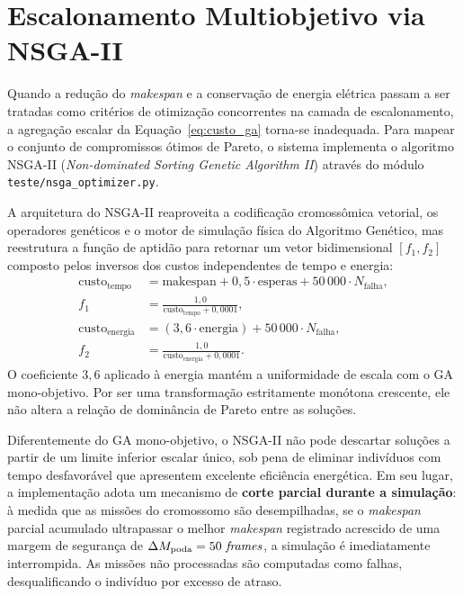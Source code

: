\section{Escalonamento Multiobjetivo via NSGA-II}\label{sec:dev_nsga}

Quando a redução do \textit{makespan} e a conservação de energia elétrica passam a ser tratadas como critérios de otimização concorrentes na camada de escalonamento, a agregação escalar da Equação~\eqref{eq:custo_ga} torna-se inadequada. Para mapear o conjunto de compromissos ótimos de Pareto, o sistema implementa o algoritmo NSGA-II (\textit{Non-dominated Sorting Genetic Algorithm II}) através do módulo \texttt{teste/nsga\_optimizer.py}.

A arquitetura do NSGA-II reaproveita a codificação cromossômica vetorial, os operadores genéticos e o motor de simulação física do Algoritmo Genético, mas reestrutura a função de aptidão para retornar um vetor bidimensional $[f_1, f_2]$ composto pelos inversos dos custos independentes de tempo e energia:
\begin{align}
\text{custo}_{\text{tempo}} &= \text{makespan} + 0{,}5 \cdot \text{esperas} + 50\,000 \cdot N_{\text{falha}}, \label{eq:custo_tempo_nsga} \\
f_1 &= \frac{1{,}0}{\text{custo}_{\text{tempo}} + 0{,}0001}, \label{eq:f1_nsga} \\
\text{custo}_{\text{energia}} &= (3{,}6 \cdot \text{energia}) + 50\,000 \cdot N_{\text{falha}}, \label{eq:custo_energia_nsga} \\
f_2 &= \frac{1{,}0}{\text{custo}_{\text{energia}} + 0{,}0001}. \label{eq:f2_nsga}
\end{align}
O coeficiente $3{,}6$ aplicado à energia mantém a uniformidade de escala com o GA mono-objetivo. Por ser uma transformação estritamente monótona crescente, ele não altera a relação de dominância de Pareto entre as soluções.

Diferentemente do GA mono-objetivo, o NSGA-II não pode descartar soluções a partir de um limite inferior escalar único, sob pena de eliminar indivíduos com tempo desfavorável que apresentem excelente eficiência energética. Em seu lugar, a implementação adota um mecanismo de \textbf{corte parcial durante a simulação}: à medida que as missões do cromossomo são desempilhadas, se o \textit{makespan} parcial acumulado ultrapassar o melhor \textit{makespan} registrado acrescido de uma margem de segurança de $\Delta M_{\text{poda}} = 50\text{ \textit{frames}}$, a simulação é imediatamente interrompida. As missões não processadas são computadas como falhas, desqualificando o indivíduo por excesso de atraso.


